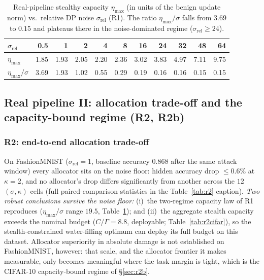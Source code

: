 \documentclass[final,1p,times]{elsarticle}
\begin{document}
\begin{table}[!t]
\centering
\caption{Real-pipeline stealthy capacity $\eta_{\max}$ (in units of the
benign update norm) vs.\ relative DP noise $\sigma_{\mathrm{rel}}$ (R1).
The ratio $\eta_{\max}/\sigma$ falls from $3.69$ to $0.15$ and plateaus
there in the noise-dominated regime ($\sigma_{\mathrm{rel}}\ge 24$).}
\label{tab:r1}
\begin{tabular}{lrrrrrrrrrr}
\toprule
$\sigma_{\mathrm{rel}}$ & 0.5 & 1 & 2 & 4 & 8 & 16 & 24 & 32 & 48 & 64\\
\midrule
$\eta_{\max}$ & 1.85 & 1.93 & 2.05 & 2.20 & 2.36 & 3.02 & 3.83 & 4.97 & 7.11 & 9.75\\
$\eta_{\max}/\sigma$ & 3.69 & 1.93 & 1.02 & 0.55 & 0.29 & 0.19 & 0.16 & 0.16 & 0.15 & 0.15\\
\bottomrule
\end{tabular}
\end{table}

\subsection{Real pipeline II: allocation trade-off and the
capacity-bound regime (R2, R2b)}\label{sec:real}
\subsubsection{R2: end-to-end allocation trade-off}
On FashionMNIST ($\sigma_{\mathrm{rel}}{=}1$, baseline accuracy
$0.868$ after the same attack window) every allocator sits on the
noise floor: hidden accuracy drop $\le0.6\%$ at $\kappa{=}2$, and no
allocator's drop differs significantly from another across the $12$
$(\sigma,\kappa)$ cells (full paired-comparison statistics in the
Table~\ref{tab:r2} caption).
\emph{Two robust conclusions survive the noise floor:}
(i)~the two-regime capacity law of R1 reproduces
($\eta_{\max}/\sigma$ range $19.5$, Table~\ref{tab:r1}); and
(ii)~the aggregate stealth capacity exceeds the nominal budget
($C/\Gamma{=}8.8$, deployable; Table~\ref{tab:r2cifar}), so the
stealth-constrained water-filling optimum can deploy its full budget
on this dataset. Allocator superiority in absolute damage is not
established on FashionMNIST, however: that scale, and the allocator
frontier it makes measurable, only becomes meaningful where the task
margin is tight, which is the CIFAR-10 capacity-bound
regime of \S\ref{sec:r2b}.
\end{document}
